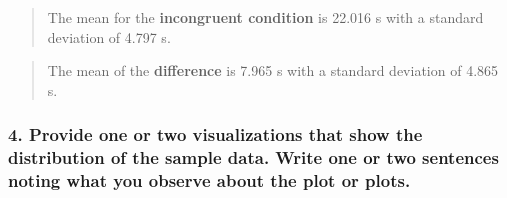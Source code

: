 \documentclass[]{article}
\begin{document}
\begin{quote}
The mean for the \textbf{incongruent condition} is 22.016 s with a
standard deviation of 4.797 s.
\end{quote}

\begin{quote}
The mean of the \textbf{difference} is 7.965 s with a standard deviation
of 4.865 s.
\end{quote}

\subsubsection{4. Provide one or two visualizations that show the
distribution of the sample data. Write one or two sentences noting what
you observe about the plot or
plots.}\label{provide-one-or-two-visualizations-that-show-the-distribution-of-the-sample-data.-write-one-or-two-sentences-noting-what-you-observe-about-the-plot-or-plots.}
\end{document}
